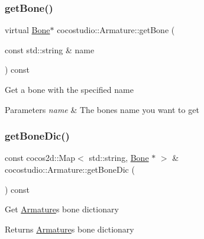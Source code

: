 \subsubsection{\texorpdfstring{get\+Bone()}{getBone()}\hspace{0.1cm}{\footnotesize\ttfamily [2/2]}}
{\footnotesize\ttfamily virtual \hyperlink{classcocostudio_1_1Bone}{Bone}$\ast$ cocostudio\+::\+Armature\+::get\+Bone (\begin{DoxyParamCaption}\item[{const std\+::string \&}]{name }\end{DoxyParamCaption}) const\hspace{0.3cm}{\ttfamily [virtual]}}

Get a bone with the specified name


\begin{DoxyParams}{Parameters}
{\em name} & The bone\textquotesingle{}s name you want to get \\
\hline
\end{DoxyParams}
\mbox{\label{classcocostudio_1_1Armature_a46584bbc3ff6ae89dc94388d10cdd19a}} 
\subsubsection{\texorpdfstring{get\+Bone\+Dic()}{getBoneDic()}\hspace{0.1cm}{\footnotesize\ttfamily [1/2]}}
{\footnotesize\ttfamily const cocos2d\+::\+Map$<$ std\+::string, \hyperlink{classcocostudio_1_1Bone}{Bone} $\ast$ $>$ \& cocostudio\+::\+Armature\+::get\+Bone\+Dic (\begin{DoxyParamCaption}{ }\end{DoxyParamCaption}) const}

Get \hyperlink{classcocostudio_1_1Armature}{Armature}\textquotesingle{}s bone dictionary \begin{DoxyReturn}{Returns}
\hyperlink{classcocostudio_1_1Armature}{Armature}\textquotesingle{}s bone dictionary 
\end{DoxyReturn}
\mbox{\label{classcocostudio_1_1Armature_a87c56d4bba4ed13a510cd1b2781465a3}} 
